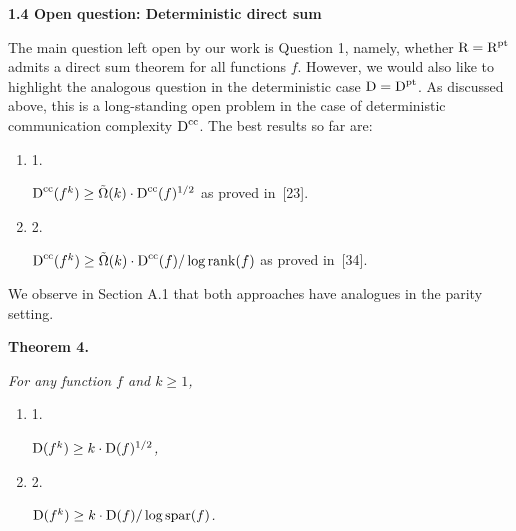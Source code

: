\par\medskip\noindent\textbf{
1.4 Open question: Deterministic direct sum}\par




The main question left open by our work is Question 1, namely, whether ${\textup{R}}={\textup{R}}^{\textup{pt}}$ admits a direct sum theorem for all functions $f$. However, we would also like to highlight the analogous question in the deterministic case ${\textup{D}}={\textup{D}}^{\textup{pt}}$. As discussed above, this is a long-standing open problem in the case of deterministic communication complexity ${\textup{D}}^{\textup{cc}}$. The best results so far are:\par


\begin{enumerate}


\item[] 
1. 


${\textup{D}}^{\textup{cc}}(f^{k})\geq\tilde{\Omega}(k)\cdot{\textup{D}}^{\textup{cc}}(f)^{1/2}$ as proved in [23].\par





\item[] 
2. 


${\textup{D}}^{\textup{cc}}(f^{k})\geq\tilde{\Omega}(k)\cdot{\textup{D}}^{\textup{cc}}(f)/\log\mathrm{rank}(f)$ as proved in [34].\par





\end{enumerate}


We observe in Section A.1 that both approaches have analogues in the parity setting.\par





\par\medskip\noindent\textbf{
\textbf{Theorem 4}\textbf{.}
}\par



\emph{For any function $f$ and $k\geq 1$,}\par


\begin{enumerate}


\item[] 
1. 


${\textup{D}}(f^{k})\geq k\cdot{\textup{D}}(f)^{1/2}$\emph{,}\par





\item[] 
2. 


${\textup{D}}(f^{k})\geq k\cdot{\textup{D}}(f)/\log\mathrm{spar}(f)$\emph{.}\par





\end{enumerate}



